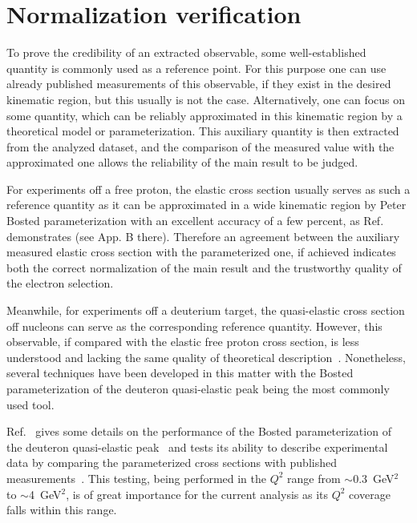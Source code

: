 \chapter{Normalization verification}
\label{Sect:norm}

To prove the credibility of an extracted observable, some well-established quantity is commonly used as a reference point. For this purpose one can use already published measurements of this observable, if they exist in the desired kinematic region, but this usually is not the case. Alternatively, one can focus on some quantity, which can be reliably approximated in this kinematic region by a theoretical model or parameterization. 
This auxiliary quantity is then extracted from the analyzed dataset, and the comparison of the measured value with the approximated one allows the reliability of the main result to be judged.

For experiments off a free proton, the elastic cross section usually serves as such a reference quantity as it can be approximated in a wide kinematic region by Peter Bosted parameterization with an excellent accuracy of a few percent, as Ref.~\cite{note_QE_peak}  demonstrates (see App. B there). Therefore an agreement between the auxiliary measured elastic cross section with the parameterized one, if achieved indicates both the correct normalization of the main result and the trustworthy quality of the electron selection.


Meanwhile, for experiments off a deuterium target, the quasi-elastic cross section off nucleons can serve as the corresponding reference quantity. 
However, this observable, if compared with the elastic free proton cross section, is less understood and lacking the same quality of theoretical description~\cite{note_QE_peak}. Nonetheless, several techniques have been developed in this matter with the Bosted parameterization of the deuteron quasi-elastic peak being the most commonly used tool.



Ref.~\cite{note_QE_peak} gives some details on the performance of the Bosted parameterization of the deuteron quasi-elastic peak~\cite{Bosted_fit,Bosted:2007xd} and tests its ability to describe experimental data by comparing the parameterized cross sections with published measurements~\cite{Hanson:1973vf,Rock:1991jy,Rock_SLAC}. This testing, being performed in the $Q^{2}$ range from $\sim$0.3~GeV$^2$ to $\sim$4~GeV$^2$, is of great importance for the current analysis as its $Q^{2}$ coverage falls within this range.


